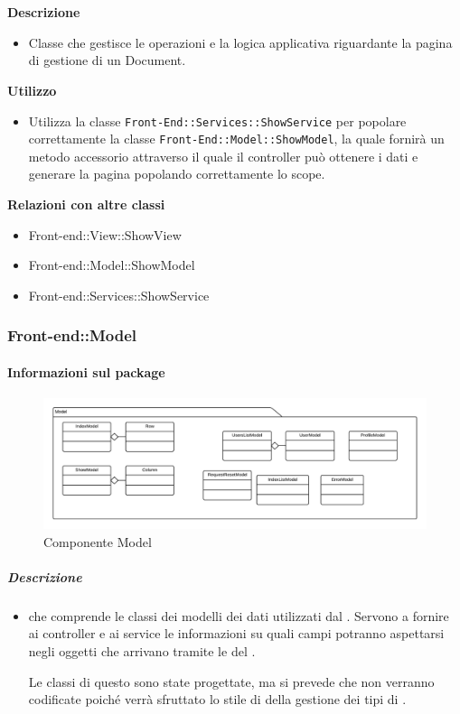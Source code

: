 				\textbf{\\ \\ Descrizione} 
					\begin{itemize}
						\item[] Classe che gestisce le operazioni e la logica applicativa riguardante la pagina di gestione di un Document.
					\end{itemize}      
				\textbf{Utilizzo}  
					\begin{itemize}
						\item[] Utilizza la classe \texttt{Front-End::Services::ShowService} per popolare correttamente la classe \texttt{Front-End::Model::ShowModel}, la quale fornirà un metodo accessorio attraverso il quale il controller può ottenere i dati e generare la pagina popolando correttamente lo scope.
					\end{itemize}
					\textbf{Relazioni con altre classi}
					\begin{itemize}
							\item{Front-end::View::ShowView}
							\item{Front-end::Model::ShowModel}
							\item{Front-end::Services::ShowService}
					\end{itemize}
	\subsubsection{Front-end::Model}
	\paragraph{Informazioni sul package} 
		\begin{figure}[H] 
			\begin{center} 
				\includegraphics[width=\textwidth]{uml/package/Front-end::Model.png}  
				\caption{Componente Model}
			\end{center}  
		\end{figure} 
	\subparagraph{Descrizione} 
		\begin{itemize}
		\item[]  che comprende le classi dei modelli dei dati utilizzati dal . Servono a fornire ai controller e ai service le informazioni su quali campi potranno aspettarsi negli oggetti che arrivano tramite le  del .

Le classi di questo  sono state progettate, ma si prevede che non verranno codificate poiché verrà sfruttato lo stile di  della gestione dei tipi di .
		\end{itemize} 
